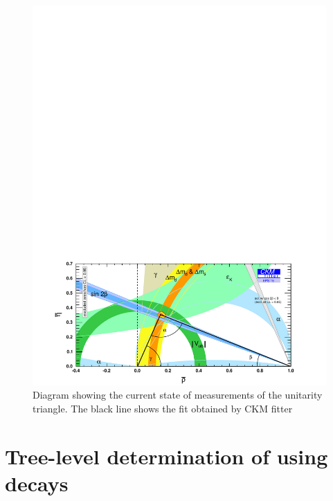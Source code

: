 \begin{figure}[!ht]
\centering
\includegraphics[trim = 0mm 0mm 0mm 180mm,clip,width=0.9\linewidth]{figures/theory/rhoeta_small_global.pdf}
\caption{Diagram showing the current state of measurements of the unitarity triangle. The black line shows the fit obtained by CKM fitter}
\label{globalfit}
\end{figure}

\section{Tree-level determination of \Pgamma using  decays}

